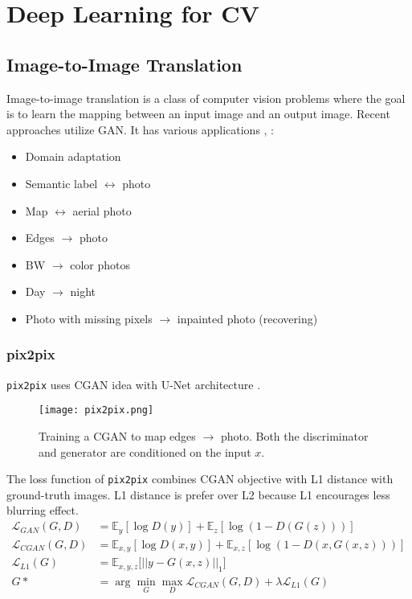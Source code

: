 \chapter{Deep Learning for CV}
\todo{}

\section{Image-to-Image Translation}
Image-to-image translation is a class of computer vision problems where the goal is to learn the mapping between an input image and an output image. Recent approaches utilize \ac{GAN}. It has various applications \cite{isola2017image, zhu2017unpaired}, \eg:
\begin{itemize}
	\item Domain adaptation
	\item Semantic label $\leftrightarrow$ photo
	\item Map $\leftrightarrow$ aerial photo
	\item Edges $\rightarrow$ photo
	\item BW $\rightarrow$ color photos
	\item Day $\rightarrow$ night
	\item Photo with missing pixels $\rightarrow$ inpainted photo (recovering)
\end{itemize}

\subsection{pix2pix}
\texttt{pix2pix} uses \ac{CGAN} idea with U-Net architecture \cite{isola2017image}.
\begin{figure}[hbt!]
	\centering
	\texttt{[image: pix2pix.png]}
	\caption{Training a \ac{CGAN} to map edges $\rightarrow$ photo. Both the discriminator and generator are conditioned on the input $x$. \cite{isola2017image}}
\end{figure}

The loss function of \texttt{pix2pix} combines \ac{CGAN} objective with L1 distance with ground-truth images. L1 distance is prefer over L2 because L1 encourages less blurring effect.
\begin{align}
	\mathcal{L}_{GAN}(G,D) &= \mathbb{E}_y [\log D(y)] + \mathbb{E}_z [\log (1-D(G(z)))]\\
	\mathcal{L}_{CGAN}(G,D) &= \mathbb{E}_{x,y} [\log D(x,y)] + \mathbb{E}_{x,z} [\log (1-D(x,G(x,z)))]\\
	\mathcal{L}_{L1}(G) &= \mathbb{E}_{x,y,z} \big[ ||y-G(x,z)||_1 \big]\\
	G* &= \arg \underset{G}{\min} \underset{D}{\max} \mathcal{L}_{CGAN}(G,D) + \lambda \mathcal{L}_{L1}(G)
\end{align}

